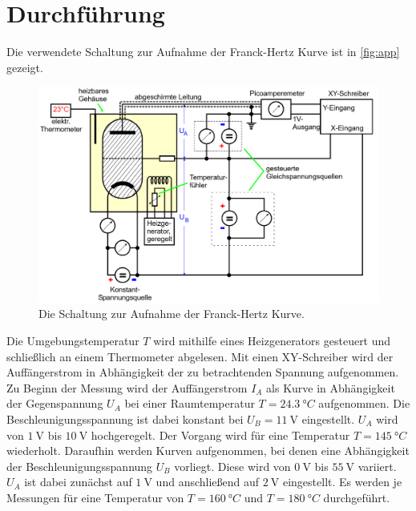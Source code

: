\section{Durchführung}
\label{sec:durchführung}
Die verwendete Schaltung zur Aufnahme der Franck-Hertz Kurve ist in \autoref{fig:app} gezeigt.
\begin{figure}[H]
	\centering
	\includegraphics[width=0.75\linewidth]{content/grafik/apperatur.png}
	\caption{Die Schaltung zur Aufnahme der Franck-Hertz Kurve. \cite{franck}}
	\label{fig:app}
\end{figure}
Die Umgebungstemperatur $T$ wird mithilfe eines Heizgenerators gesteuert und schließlich an einem 
Thermometer abgelesen. Mit einen XY-Schreiber wird der Auffängerstrom in Abhängigkeit der zu betrachtenden Spannung aufgenommen.
Zu Beginn der Messung wird der Auffängerstrom $I_A$ als Kurve in Abhängigkeit der Gegenspannung $U_A$ bei einer Raumtemperatur $T =\qty{24.3}{°C}$ aufgenommen.
Die Beschleunigungsspannung ist dabei konstant bei $ U_B = \SI{11}{\volt}$ eingestellt. $U_A$ wird von $\SI{1}{\volt}$ bis $\SI{10}{\volt}$ hochgeregelt.
Der Vorgang wird für eine Temperatur $T =\qty{145}{°C}$ wiederholt. Daraufhin werden Kurven aufgenommen, bei denen eine Abhängigkeit der
Beschleunigungsspannung $U_B$ vorliegt. Diese wird von $\SI{0}{\volt}$ bis $\SI{55}{\volt}$ variiert. $U_A$ ist dabei zunächst auf $\SI{1}{\volt}$ und
anschließend auf $\SI{2}{\volt}$ eingestellt. Es werden je Messungen für eine Temperatur von $T = \qty{160}{°C}$ und $T = \qty{180}{°C}$ durchgeführt.
